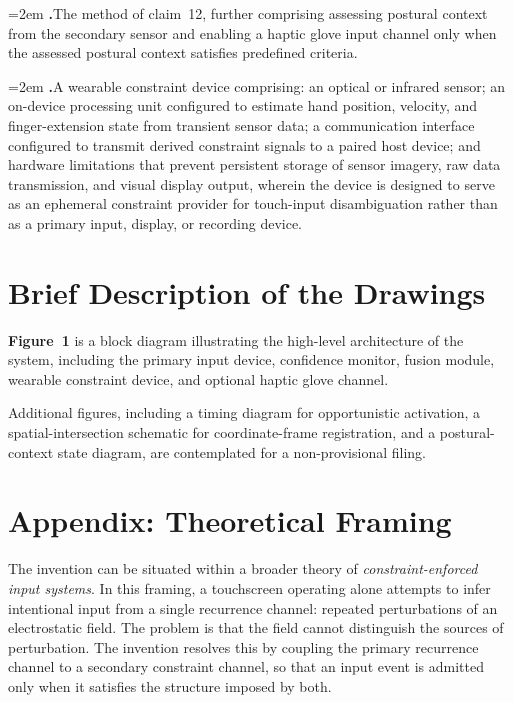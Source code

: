 \documentclass[11pt,letterpaper]{article}
\newcounter{claimnum}
\newcommand{\claim}[1]{%
  \stepcounter{claimnum}%
  \par\noindent\hangindent=2em
  \textbf{\theclaimnum.}\quad #1\par\smallskip
}
\begin{document}
\claim{The method of claim~12, further comprising assessing postural context from
the secondary sensor and enabling a haptic glove input channel only when the assessed
postural context satisfies predefined criteria.}

\claim{A wearable constraint device comprising: an optical or infrared sensor;
an on-device processing unit configured to estimate hand position, velocity, and
finger-extension state from transient sensor data; a communication interface
configured to transmit derived constraint signals to a paired host device; and
hardware limitations that prevent persistent storage of sensor imagery, raw data
transmission, and visual display output, wherein the device is designed to serve
as an ephemeral constraint provider for touch-input disambiguation rather than as
a primary input, display, or recording device.}

\section*{Brief Description of the Drawings}

\textbf{Figure~1} is a block diagram illustrating the high-level architecture of the
system, including the primary input device, confidence monitor, fusion module,
wearable constraint device, and optional haptic glove channel.

Additional figures, including a timing diagram for opportunistic activation, a
spatial-intersection schematic for coordinate-frame registration, and a postural-
context state diagram, are contemplated for a non-provisional filing.

\section*{Appendix: Theoretical Framing}

The invention can be situated within a broader theory of \emph{constraint-enforced
input systems}. In this framing, a touchscreen operating alone attempts to infer
intentional input from a single recurrence channel: repeated perturbations of an
electrostatic field. The problem is that the field cannot distinguish the sources
of perturbation. The invention resolves this by coupling the primary recurrence
channel to a secondary constraint channel, so that an input event is admitted only
when it satisfies the structure imposed by both.
\end{document}
